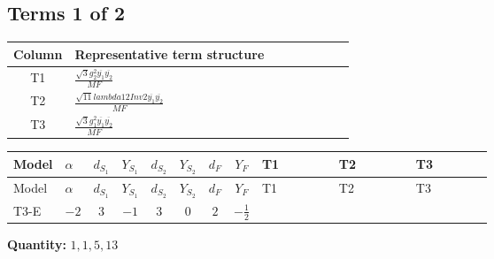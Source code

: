 \documentclass[8pt]{article}
\begin{document}
\begin{landscape}
\subsection*{Terms 1 of 2}
\begin{center}
\begin{tabular}{@{}c >{\raggedright\arraybackslash}p{0.82\linewidth}@{}}
\toprule
Column & Representative term structure \\
\midrule
T1 & \(\displaystyle \frac{\sqrt{3} g_{2}^{2} \overline{y_{1}} \overline{y_{2}}}{MF}\) \\
\midrule
T2 & \(\displaystyle \frac{\sqrt{11} lambda12Inv2 \overline{y_{1}} \overline{y_{2}}}{MF}\) \\
\midrule
T3 & \(\displaystyle \frac{\sqrt{3} g_{1}^{2} \overline{y_{1}} \overline{y_{2}}}{MF}\) \\
\midrule
\bottomrule
\end{tabular}
\end{center}
\smallskip
\tiny
\begin{longtable}{@{}llcccccc >{\raggedright\arraybackslash}p{0.21\linewidth} >{\raggedright\arraybackslash}p{0.21\linewidth} >{\raggedright\arraybackslash}p{0.21\linewidth}@{}}
\toprule
Model & $\alpha$ & $d_{S_1}$ & $Y_{S_1}$ & $d_{S_2}$ & $Y_{S_2}$ & $d_F$ & $Y_F$ & T1 & T2 & T3 \\
\midrule
\endfirsthead
\toprule
Model & $\alpha$ & $d_{S_1}$ & $Y_{S_1}$ & $d_{S_2}$ & $Y_{S_2}$ & $d_F$ & $Y_F$ & T1 & T2 & T3 \\
\midrule
\endhead
T3-E & $-2$ & $3$ & $-1$ & $3$ & $0$ & $2$ & $-\frac{1}{2}$ & \scriptsize\adjustbox{max width=\linewidth}{$\begin{gathered} - \frac{11 \sqrt{3} g_{2}^{2} \overline{y_{1}} \overline{y_{2}}}{8 MF}\end{gathered}$} & \scriptsize\adjustbox{max width=\linewidth}{$\begin{gathered} - \frac{3 \sqrt{11} lambda12Inv2 \overline{y_{1}} \overline{y_{2}}}{22 MF}\end{gathered}$} & \scriptsize\adjustbox{max width=\linewidth}{$\begin{gathered} - \frac{\sqrt{3} g_{1}^{2} \overline{y_{1}} \overline{y_{2}}}{8 MF}\end{gathered}$} \\
\midrule
\bottomrule
\end{longtable}
\clearpage
\noindent\textbf{Quantity: }$\mathrm{1,1,5,13}$\par\smallskip

\end{landscape}
\end{document}
